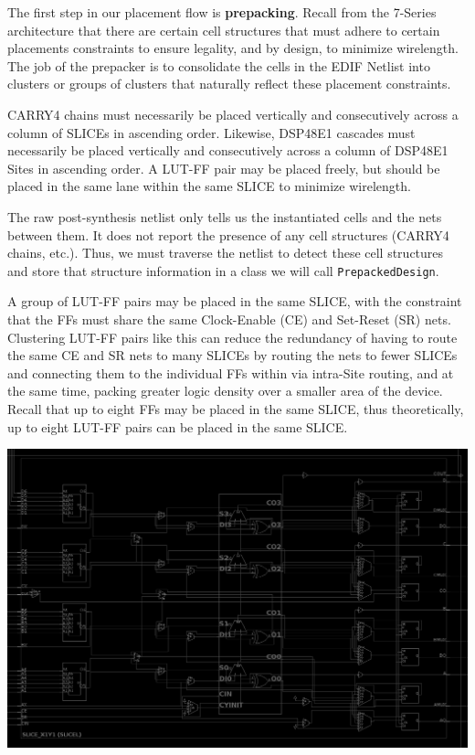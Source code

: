 \documentclass{article}
\begin{document}
        \begin{multicols}{2}

        The first step in our placement flow is \textbf{prepacking}. 
        Recall from the 7-Series architecture that there are certain cell structures that must adhere to certain placements constraints to ensure legality, and by design, to minimize wirelength. 
        The job of the prepacker is to consolidate the cells in the EDIF Netlist into clusters or groups of clusters that naturally reflect these placement constraints. 

        CARRY4 chains must necessarily be placed vertically and consecutively across a column of SLICEs in ascending order. 
        Likewise, DSP48E1 cascades must necessarily be placed vertically and consecutively across a column of DSP48E1 Sites in ascending order. 
        A LUT-FF pair may be placed freely, but should be placed in the same lane within the same SLICE to minimize wirelength.

        The raw post-synthesis netlist only tells us the instantiated cells and the nets between them. 
        It does not report the presence of any cell structures (CARRY4 chains, etc.). 
        Thus, we must traverse the netlist to detect these cell structures and store that structure information in a class we will call \texttt{PrepackedDesign}.

        A group of LUT-FF pairs may be placed in the same SLICE, with the constraint that the FFs must share the same Clock-Enable (CE) and Set-Reset (SR) nets.
        Clustering LUT-FF pairs like this can reduce the redundancy of having to route the same CE and SR nets to many SLICEs by routing the nets to fewer SLICEs and connecting them to the individual FFs within via intra-Site routing, and at the same time, packing greater logic density over a smaller area of the device. 
        Recall that up to eight FFs may be placed in the same SLICE, thus theoretically, up to eight LUT-FF pairs can be placed in the same SLICE. 


        {
            \centering
            \includegraphics[width=\columnwidth]{figures/slicel.png}
            \label{fig:slicel}
        }



\end{multicols}
\end{document}
